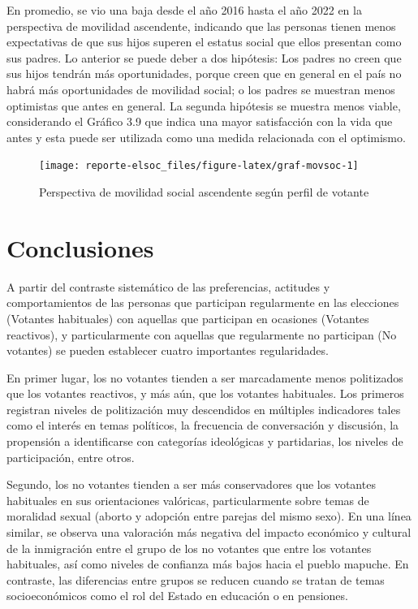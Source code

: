 \documentclass[
  12pt,
]{book}
\begin{document}
En promedio, se vio una baja desde el año 2016 hasta el año 2022 en la perspectiva de movilidad ascendente, indicando que las personas tienen menos expectativas de que sus hijos superen el estatus social que ellos presentan como sus padres. Lo anterior se puede deber a dos hipótesis: Los padres no creen que sus hijos tendrán más oportunidades, porque creen que en general en el país no habrá más oportunidades de movilidad social; o los padres se muestran menos optimistas que antes en general. La segunda hipótesis se muestra menos viable, considerando el Gráfico 3.9 que indica una mayor satisfacción con la vida que antes y esta puede ser utilizada como una medida relacionada con el optimismo.

\begin{figure}

{\centering \texttt{[image: reporte-elsoc\_files/figure-latex/graf-movsoc-1]} 

}

\caption{Perspectiva de movilidad social ascendente según perfil de votante}\label{fig:graf-movsoc}
\end{figure}

\hypertarget{conclusiones}{%
\chapter{Conclusiones}\label{conclusiones}}

A partir del contraste sistemático de las preferencias, actitudes y comportamientos de las personas que participan regularmente en las elecciones (Votantes habituales) con aquellas que participan en ocasiones (Votantes reactivos), y particularmente con aquellas que regularmente no participan (No votantes) se pueden establecer cuatro importantes regularidades.

En primer lugar, los no votantes tienden a ser marcadamente menos politizados que los votantes reactivos, y más aún, que los votantes habituales. Los primeros registran niveles de politización muy descendidos en múltiples indicadores tales como el interés en temas políticos, la frecuencia de conversación y discusión, la propensión a identificarse con categorías ideológicas y partidarias, los niveles de participación, entre otros.

Segundo, los no votantes tienden a ser más conservadores que los votantes habituales en sus orientaciones valóricas, particularmente sobre temas de moralidad sexual (aborto y adopción entre parejas del mismo sexo). En una línea similar, se observa una valoración más negativa del impacto económico y cultural de la inmigración entre el grupo de los no votantes que entre los votantes habituales, así como niveles de confianza más bajos hacia el pueblo mapuche. En contraste, las diferencias entre grupos se reducen cuando se tratan de temas socioeconómicos como el rol del Estado en educación o en pensiones.
\end{document}
